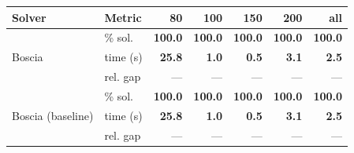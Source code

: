 \begin{tabular}{llrrrrr}
\toprule
 Solver & Metric & 80 & 100 & 150 & 200 & all \\
\midrule
\multirow{3}{*}{Boscia} & \% sol. & \textbf{100.0} & \textbf{100.0} & \textbf{100.0} & \textbf{100.0} & \textbf{100.0} \\
  & time (s) & \textbf{25.8} & \textbf{1.0} & \textbf{0.5} & \textbf{3.1} & \textbf{2.5} \\
  & rel. gap & --- & --- & --- & --- & --- \\
\midrule
\multirow{3}{*}{Boscia (baseline)} & \% sol. & \textbf{100.0} & \textbf{100.0} & \textbf{100.0} & \textbf{100.0} & \textbf{100.0} \\
  & time (s) & \textbf{25.8} & \textbf{1.0} & \textbf{0.5} & \textbf{3.1} & \textbf{2.5} \\
  & rel. gap & --- & --- & --- & --- & --- \\
\bottomrule
\end{tabular}
